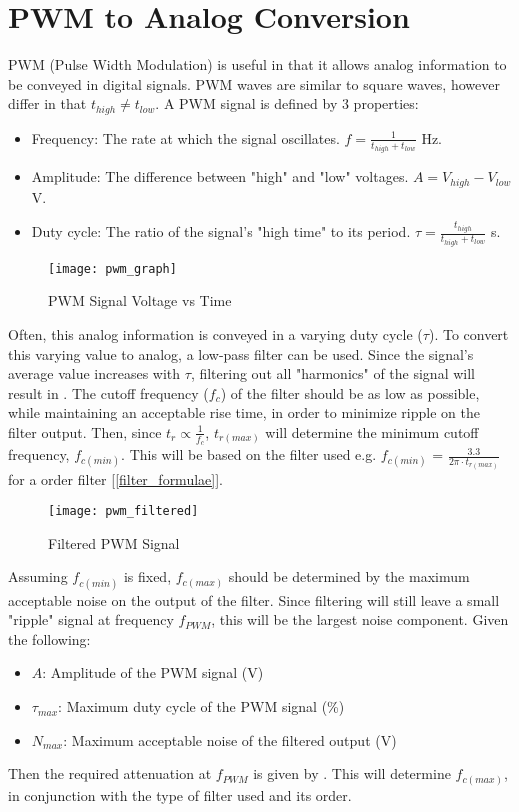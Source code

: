 \graphicspath{{content/1_literatureReview/figures/}}
\section{PWM to Analog Conversion}

PWM (Pulse Width Modulation) is useful in that it allows analog information to be conveyed in digital signals.
PWM waves are similar to square waves, however differ in that $t_{high} \neq t_{low}$. A PWM signal is defined by 3 properties:
\begin{itemize}
    \item Frequency: The rate at which the signal oscillates. $f = \frac{1}{t_{high} + t_{low}}$ Hz.
    \item Amplitude: The difference between "high" and "low" voltages. $A = V_{high} - V_{low}$ V.
    \item Duty cycle: The ratio of the signal's "high time" to its period. $\tau = \frac{t_{high}}{t_{high} + t_{low}}$ s.
\end{itemize}

\begin{figure}[!htb]
  \centering
  \texttt{[image: pwm\_graph]}
  \caption{PWM Signal Voltage vs Time \cite{pwmGraph}}
\end{figure}

Often, this analog information is conveyed in a varying duty cycle ($\tau$). To convert this varying value to analog,
a low-pass filter can be used. Since the signal's average value increases with $\tau$, filtering out all "harmonics" of the
signal will result in  \cite{pwmAnalogConversion}. The cutoff frequency ($f_{c}$) of the filter
should be as low as possible, while maintaining an acceptable rise time, in order to minimize ripple on the filter output.
Then, since $t_r \propto \frac{1}{f_c}$, $t_{r(max)}$ will determine the minimum cutoff frequency, $f_{c(min)}$. This will be based on the filter used
e.g. $f_{c(min)}$ = $\frac{3.3}{2 \pi \cdot t_{r(max)}}$ for a  order filter [\ref{filter_formulae}].

\begin{figure}[!htb]
  \centering
  \texttt{[image: pwm\_filtered]}
  \caption{Filtered PWM Signal \cite{pwmAnalogConversion}}
\end{figure}

Assuming $f_{c(min)}$ is fixed, $f_{c(max)}$ should be determined by the maximum acceptable noise on the output of the filter.
Since filtering will still leave a small "ripple" signal at frequency $f_{PWM}$, this will be the largest noise component. Given the following:
\begin{itemize}
  \item $A$: Amplitude of the PWM signal (V)
  \item $\tau_{max}$: Maximum duty cycle of the PWM signal (\%)
  \item $N_{max}$: Maximum acceptable noise of the filtered output (V)
\end{itemize}

\noindent Then the required attenuation at $f_{PWM}$ is given by .
This will determine $f_{c(max)}$, in conjunction with the type of filter used and its order.